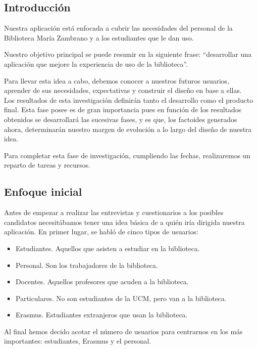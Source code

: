 \documentclass[12pt]{article}
\begin{document}
\subsection{Introducción}

Nuestra aplicación está enfocada a cubrir las necesidades del personal de la Biblioteca María Zambrano y a los estudiantes que le dan uso.

Nuestro objetivo principal se puede resumir en la siguiente frase:
“desarrollar una aplicación que mejore la experiencia de uso de la biblioteca”.

Para llevar esta idea a cabo, debemos conocer a nuestros futuros usuarios, aprender de sus necesidades, expectativas y construir el diseño en base a ellas. Los resultados de esta investigación definirán tanto el desarrollo como el producto final. Esta fase posee es de gran importancia pues en función de los resultados obtenidos se desarrollará las sucesivas fases, y es que, los factoides generados ahora, determinarán nuestro margen de evolución a lo largo del diseño de nuestra idea.

Para completar esta fase de investigación, cumpliendo las fechas, realizaremos un reparto de tareas y recursos. 

\subsection{Enfoque inicial}

Antes de empezar a realizar las entrevistas y cuestionarios a los posibles candidatos necesitábamos tener una idea básica de a quién iría dirigida nuestra aplicación. En primer lugar, se habló de cinco tipos de usuarios:

\begin{itemize}

\item Estudiantes. Aquellos que asisten a estudiar en la biblioteca.
\item Personal. Son los trabajadores de la biblioteca.
\item Docentes. Aquellos profesores que acuden a la biblioteca.
\item Particulares. No son estudiantes de la UCM, pero van a la biblioteca.
\item Erasmus. Estudiantes extranjeros que usan la biblioteca.

\end{itemize}

Al final hemos decido acotar el número de usuarios para centrarnos en los más importantes: estudiantes, Erasmus y el personal.
\end{document}
